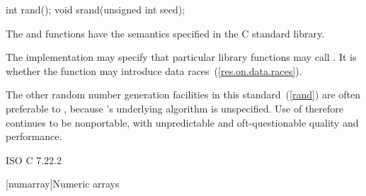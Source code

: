 %
%
\begin{itemdecl}
int rand();
void srand(unsigned int seed);
\end{itemdecl}

\begin{itemdescr}
\pnum
\effects
The
 and 
functions have the semantics specified in the C standard library.

\pnum
\remarks
The implementation
may specify that particular library functions may call
.
It is 
whether the  function
may introduce data races~(\ref{res.on.data.races}).
\begin{note}
%
The other random
number generation facilities in this standard~(\ref{rand}) are often preferable
to , because 's underlying algorithm is unspecified.
Use of  therefore continues to be nonportable, with unpredictable
and oft-questionable quality and performance.
\end{note}
\end{itemdescr}

\xref ISO C 7.22.2



[numarray]{Numeric arrays}

